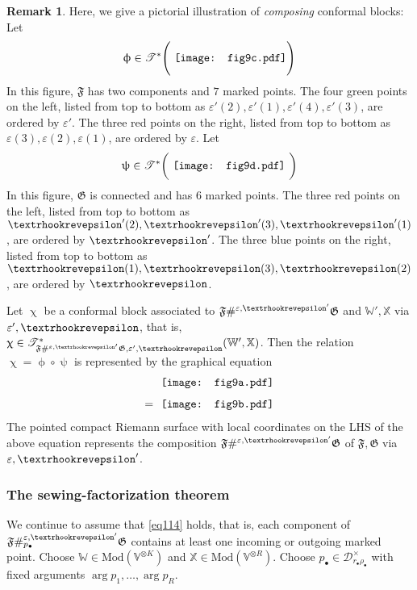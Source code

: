 \documentclass[11pt,b5paper,notitlepage]{article}
\theoremstyle{definition}
\newtheorem{rem}[df]{Remark}
\theoremstyle{plain}
\newcommand{\blt}{\bullet}
\newcommand{\Vbb}{\mathbb V}
\newcommand{\Xbb}{\mathbb X}
\newcommand{\Wbb}{\mathbb W}
\newcommand{\<}{\left\langle}
\renewcommand{\>}{\right\rangle}
\newcommand{\ST}{\mathscr{T}}
\newcommand{\MD}{\mathcal{D}}
\newcommand{\Mod}{\mathrm{Mod}}
\newcommand{\eps}{\varepsilon}
\newcommand{\ff}{\mathfrak{F}}
\newcommand{\fg}{\mathfrak{G}}
\newcommand{\hqed}{\hfill\qedsymbol}
\newcommand{\tipae}{\text{\textrhookrevepsilon}}
\numberwithin{equation}{section}
\begin{document}
\begin{rem}\label{lb41}
Here, we give a pictorial illustration of \textit{composing} conformal blocks: Let
  \begin{gather*}
	\upphi\in \ST^*\Bigg(\vcenter{\hbox{{
		\texttt{[image: fig9c.pdf]}}}}\Bigg)
  \end{gather*} 
In this figure, $\ff$ has two components and $7$ marked points. The four green points on the left, listed from top to bottom as $\eps'(2),\eps'(1),\eps'(4),\eps'(3)$, are ordered by $\eps'$. The three red points on the right, listed from top to bottom as $\eps(3),\eps(2),\eps(1)$, are ordered by $\eps$. Let
\begin{gather*}
 \uppsi\in \ST^*\bigg(\vcenter{\hbox{{
			\texttt{[image: fig9d.pdf]}}}}~\bigg)
\end{gather*}
In this figure, $\fg$ is connected and has $6$ marked points. The three red points on the left, listed from top to bottom as $\tipae'(2),\tipae'(3),\tipae'(1)$, are ordered by $\tipae'$. The three blue points on the right, listed from top to bottom as $\tipae(1),\tipae(3),\tipae(2)$, are ordered by $\tipae$.

Let $\upchi$ be a conformal block associated to $\ff\#^{\eps,\tipae'}\fg$ and $\Wbb',\Xbb$ via $\eps',\tipae$, that is, $\upchi\in\ST^*_{\ff\#^{\eps,\tipae'}\fg,\eps',\tipae}(\Wbb',\Xbb)$. Then the relation $\upchi=\upphi\circ\uppsi$ is represented by the graphical equation
\begin{align*}
&\vcenter{\hbox{{
		 \texttt{[image: fig9a.pdf]}}}}\\[1ex]
=~&\vcenter{\hbox{{
			\texttt{[image: fig9b.pdf]}}}}
  \end{align*}
The pointed compact Riemann surface with local coordinates on the LHS of the above equation represents the composition $\ff\#^{\eps,\tipae'}\fg$ of $\ff,\fg$ via $\eps,\tipae'$.  \hqed
\end{rem}




\subsubsection{The sewing-factorization theorem}

We continue to assume that \eqref{eq114} holds, that is, each component of $\ff\#^{\eps,\tipae'}_{p_\blt}\fg$ contains at least one incoming or outgoing marked point. Choose $\Wbb\in\Mod(\Vbb^{\otimes K})$ and $\Xbb\in\Mod(\Vbb^{\otimes R})$. Choose $p_\blt\in\MD_{r_\blt\rho_\blt}^\times$ with fixed arguments $\arg p_1,\dots,\arg p_R$. 
\end{document}
